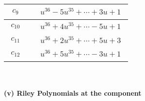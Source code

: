 \documentclass[1p]{elsarticle_modified}
\theoremstyle{definition}
\begin{document}
\begin{tabular}{m{50pt}|m{274pt}}
\hline $$\begin{aligned}c_{9}\end{aligned}$$&$\begin{aligned}
&u^{36}-5 u^{35}+\cdots+3 u+1
\end{aligned}$\\
\hline $$\begin{aligned}c_{10}\end{aligned}$$&$\begin{aligned}
&u^{36}+4 u^{35}+\cdots-5 u+1
\end{aligned}$\\
\hline $$\begin{aligned}c_{11}\end{aligned}$$&$\begin{aligned}
&u^{36}+2 u^{35}+\cdots+5 u+3
\end{aligned}$\\
\hline $$\begin{aligned}c_{12}\end{aligned}$$&$\begin{aligned}
&u^{36}+5 u^{35}+\cdots-3 u+1
\end{aligned}$\\
\hline
\end{tabular}\\~\\
\newpage\renewcommand{\arraystretch}{1}
\flushleft \textbf{(v) Riley Polynomials at the component}\newline \\
\end{document}
